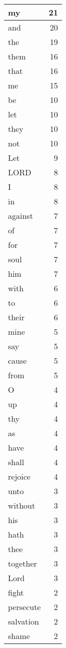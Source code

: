 \begin{center}
\begin{longtable}{l|r}
\hline \hline
\endlastfoot
my & 21 \\ \hline
and & 20 \\ \hline
the & 19 \\ \hline
them & 16 \\ \hline
that & 16 \\ \hline
me & 15 \\ \hline
be & 10 \\ \hline
let & 10 \\ \hline
they & 10 \\ \hline
not & 10 \\ \hline
Let & 9 \\ \hline
LORD & 8 \\ \hline
I & 8 \\ \hline
in & 8 \\ \hline
against & 7 \\ \hline
of & 7 \\ \hline
for & 7 \\ \hline
soul & 7 \\ \hline
him & 7 \\ \hline
with & 6 \\ \hline
to & 6 \\ \hline
their & 6 \\ \hline
mine & 5 \\ \hline
say & 5 \\ \hline
cause & 5 \\ \hline
from & 5 \\ \hline
O & 4 \\ \hline
up & 4 \\ \hline
thy & 4 \\ \hline
as & 4 \\ \hline
have & 4 \\ \hline
shall & 4 \\ \hline
rejoice & 4 \\ \hline
unto & 3 \\ \hline
without & 3 \\ \hline
his & 3 \\ \hline
hath & 3 \\ \hline
thee & 3 \\ \hline
together & 3 \\ \hline
Lord & 3 \\ \hline
fight & 2 \\ \hline
persecute & 2 \\ \hline
salvation & 2 \\ \hline
shame & 2 \\ \hline

\end{longtable}
\end{center}
